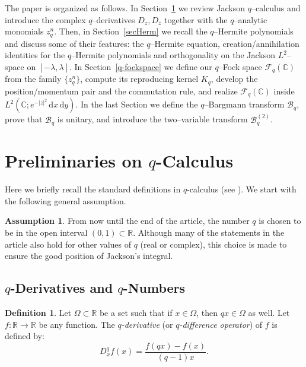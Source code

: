 \documentclass[10pt]{amsart}
\theoremstyle{plain}
\theoremstyle{definition}
\newtheorem{definition}[theorem]{Definition}
\newtheorem{assumption}[theorem]{Assumption}
\renewcommand{\bar}[1]{\overline{#1}}
\begin{document}
\medskip
The paper is organized as follows.
In Section~\ref{preliminaries} we review Jackson $q$–calculus and introduce the complex $q$–derivatives $D_z,D_{\bar z}$ together with the $q$–analytic monomials $z_q^n$. 
Then, in Section~\ref{secHerm} we recall the $q$–Hermite polynomials and discuss some of their features: the $q$–Hermite equation, creation/annihilation identities for the $q$–Hermite polynomials and orthogonality on the Jackson $L^2$–space on $[-\lambda,\lambda]$. 
In Section~\ref{q-fockspace} we define our $q$–Fock space $\mathcal F_q(\mathbb{C})$ from the family $\{z_q^n\}$, compute its reproducing kernel $K_q$, develop the position/momentum pair and the commutation rule, and realize $\mathcal{F}_q(\mathbb{C})$ inside $L^2(\mathbb{C};e^{-|z|^2}\,\mathrm{d}x\,\mathrm{d}y)$. In the last Section we  define the $q$–Bargmann transform $\mathcal{B}_{q}$, prove that $\mathcal{B}_{q}$ is unitary, and introduce the two–variable transform $\mathcal{B}_{q}^{(2)}$.







\section{Preliminaries on $q$-Calculus}\label{preliminaries}
Here we briefly recall the standard definitions in $q$-calculus (see \cite{Ernst2012,Jackson1909,Kac2002}).
We start with the following general assumption.

\begin{assumption}
From now until the end of the article, the number $q$ is chosen to be in the open interval $(0,1)\subset\mathbb{R}$. Although many of the statements in the article also hold for other values of $q$ (real or complex), this choice is made to ensure the good position of Jackson's integral.
\end{assumption}




\subsection*{$q$-Derivatives and $q$-Numbers}

\begin{definition}
Let $\Omega \subset \mathbb{R}$ be a set such that if $ x \in \Omega $, then $ qx \in \Omega $ as well. Let $ f : \mathbb{R} \to \mathbb{R} $ be any function. The \textit{$q$-derivative} (or \textit{$q$-difference operator}) of $f$ is defined by:
\[
D_x^{q} f(x) = \frac{f(qx) - f(x)}{(q - 1)x}.
\]
\end{definition}
\end{document}
